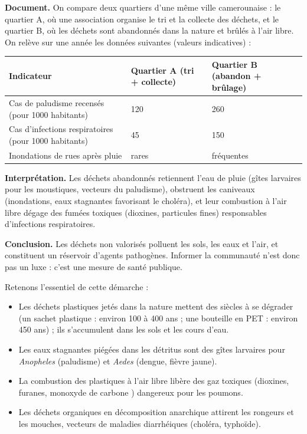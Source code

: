 \documentclass[11pt]{article}
\newcommand{\cle}[1]{{\popxbold\color{popdark}#1}}
\begin{document}
\begin{experience}
\textbf{Document.} On compare deux quartiers d'une même ville camerounaise : le quartier A, où une association organise le tri et la collecte des déchets, et le quartier B, où les déchets sont abandonnés dans la nature et brûlés à l'air libre. On relève sur une année les données suivantes (valeurs indicatives) :

\begin{center}
\begin{tabularx}{\linewidth}{|l|X|X|}
\hline
\rowcolor{popblueL} \textbf{Indicateur} & \textbf{Quartier A (tri + collecte)} & \textbf{Quartier B (abandon + brûlage)} \\
\hline
Cas de paludisme recensés (pour \num{1000} habitants) & 120 & 260 \\
\hline
Cas d'infections respiratoires (pour \num{1000} habitants) & 45 & 150 \\
\hline
Inondations de rues après pluie & rares & fréquentes \\
\hline
\end{tabularx}
\end{center}

\textbf{Interprétation.} Les déchets abandonnés retiennent l'eau de pluie (gîtes larvaires pour les moustiques, vecteurs du paludisme), obstruent les caniveaux (inondations, eaux stagnantes favorisant le choléra), et leur combustion à l'air libre dégage des fumées toxiques (dioxines, particules fines) responsables d'infections respiratoires.

\textbf{Conclusion.} Les déchets non valorisés polluent les \cle{sols}, les \cle{eaux} et l'\cle{air}, et constituent un réservoir d'agents pathogènes. Informer la communauté n'est donc pas un luxe : c'est une mesure de \cle{santé publique}.
\end{experience}

Retenons l'essentiel de cette démarche :

\begin{itemize}
\item Les déchets plastiques jetés dans la nature mettent des siècles à se dégrader (un sachet plastique : environ 100 à 400 ans ; une bouteille en PET : environ 450 ans) ; ils s'accumulent dans les sols et les cours d'eau.
\item Les eaux stagnantes piégées dans les détritus sont des gîtes larvaires pour \emph{Anopheles} (paludisme) et \emph{Aedes} (dengue, fièvre jaune).
\item La combustion des plastiques à l'air libre libère des gaz toxiques (dioxines, furanes, monoxyde de carbone ) dangereux pour les poumons.
\item Les déchets organiques en décomposition anarchique attirent les rongeurs et les mouches, vecteurs de maladies diarrhéiques (choléra, typhoïde).
\end{itemize}
\end{document}
